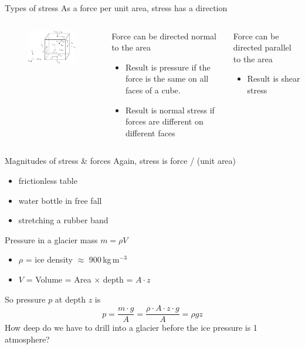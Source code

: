 \documentclass[hide notes,intlimits]{beamer}
\begin{document}
\begin{frame}{Types of stress}
  As a force per unit area, stress has a direction
  \begin{columns}
    \column[c]{5cm}
    \begin{figure}
      \includegraphics[width=4.75cm]{figures/fig_3_08}
    \end{figure}
    \column[c]{6.5cm}
   \begin{block}{}
      Force can be directed normal to the area
      \begin{itemize}
      \item Result is \alert{pressure} if the force is the same on all faces of a cube.
      \item Result is \alert{normal stress} if forces are different on different faces
      \end{itemize}
    \end{block}
    \begin{block}{} 
      Force can be directed parallel to the area
      \begin{itemize}
      \item Result is \alert{shear stress}
      \end{itemize}
    \end{block}
  \end{columns}
\end{frame}


\begin{frame}{Magnitudes of stress \& forces}
  Again, stress is force / (unit area)
     \begin{itemize}
      \item frictionless table
      \item water bottle in free fall
      \item stretching a rubber band
      \end{itemize}
\end{frame}

\begin{frame}{Pressure in a glacier}
  mass $m = \rho V$
     \begin{itemize}
      \item $\rho$ = ice density $\approx$ 900\,kg\,m$^{-3}$
      \item$V$ = Volume = Area $\times$ depth = $A \cdot z$
     \end{itemize}
     So pressure $p$ at depth $z$ is
     \begin{displaymath}
       p = \frac{m \cdot g}{A} = \frac{\rho \cdot A \cdot z \cdot g}{A} = \rho g z
     \end{displaymath}
     How deep do we have to drill into a glacier before the ice pressure is 1 atmosphere?
\end{frame}
\end{document}
